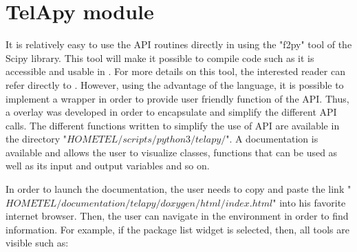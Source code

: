 \section{TelApy module}

It is relatively easy to use the \fortran API routines directly in \python using
the "f2py" tool of the \python Scipy library. This tool will make it possible
to compile \fortran code such as it is accessible and usable in \python. For more
details on this tool, the interested reader can refer directly to
\cite{Peterson2009}. However, using the advantage of the \python language, it
is possible to implement a wrapper in order to provide user friendly function
of the \fortran API\@. Thus, a \python overlay was developed in order to
encapsulate and simplify the different API \python calls. The different \python
functions written to simplify the use of API are available in the directory
"$HOMETEL/scripts/python3/telapy/$".
A \doxygen documentation is available and allows the user to visualize \python
classes, functions that can be used as well as its input and output variables
and so on.

In order to launch the \doxygen documentation, the user needs to copy and paste
the link "$HOME$\-$TEL/documentation/telapy/doxygen/html/index.html$" into his
favorite internet browser. Then, the user can navigate in the \doxygen
environment in order to find information. For example, if the package list
widget is selected, then, all \python tools are visible such as:

